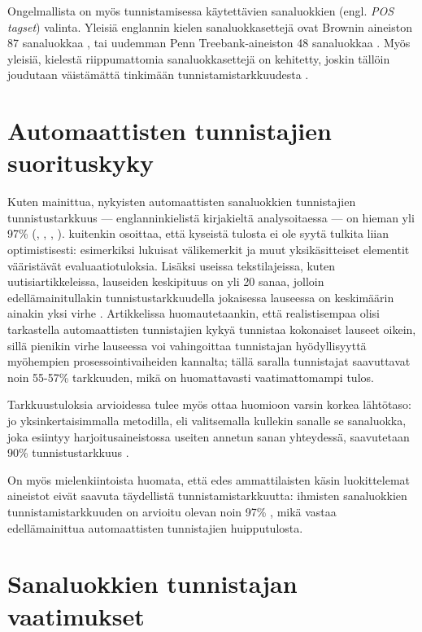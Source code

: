 \documentclass[utf8,bachelor,manualbib]{gradu3}
\begin{document}
Ongelmallista on myös tunnistamisessa käytettävien sanaluokkien (engl. \emph{POS tagset}) valinta. Yleisiä englannin kielen sanaluokkasettejä ovat Brownin aineiston 87 sanaluokkaa \citep{francis1964}, tai uudemman Penn Treebank-aineiston 48 sanaluokkaa \citep{marcus1993}. Myös yleisiä, kielestä riippumattomia sanaluokkasettejä on kehitetty, joskin tällöin joudutaan väistämättä tinkimään tunnistamistarkkuudesta \citep{petrov2011}.


\section{Automaattisten tunnistajien suorituskyky}

Kuten mainittua, nykyisten automaattisten sanaluokkien tunnistajien tunnistustarkkuus --- englanninkielistä kirjakieltä analysoitaessa --- on hieman yli 97\%  (\citealp{toutanova2003}, \citealp{shen2007}, \citealp{spoustova2009}, \citealp{sogaard2010}). \citet{manning2011} kuitenkin osoittaa, että kyseistä tulosta ei ole syytä tulkita liian optimistisesti: esimerkiksi lukuisat välikemerkit ja muut yksikäsitteiset elementit vääristävät evaluaatiotuloksia. Lisäksi useissa tekstilajeissa, kuten uutisiartikkeleissa, lauseiden keskipituus on yli 20 sanaa, jolloin edellämainitullakin tunnistustarkkuudella jokaisessa lauseessa on keskimäärin ainakin yksi virhe \citep{manning1999}. Artikkelissa huomautetaankin, että realistisempaa olisi tarkastella automaattisten tunnistajien kykyä tunnistaa kokonaiset lauseet oikein, sillä pienikin virhe lauseessa voi vahingoittaa tunnistajan hyödyllisyyttä myöhempien prosessointivaiheiden kannalta; tällä saralla tunnistajat saavuttavat noin 55-57\% tarkkuuden, mikä on huomattavasti vaatimattomampi tulos.

Tarkkuustuloksia arvioidessa tulee myös ottaa huomioon varsin korkea lähtötaso: jo yksinkertaisimmalla metodilla, eli valitsemalla kullekin sanalle se sanaluokka, joka esiintyy harjoitusaineistossa useiten annetun sanan yhteydessä, saavutetaan 90\% tunnistustarkkuus \citep{charniak1993}.

 On myös mielenkiintoista huomata, että edes ammattilaisten käsin luokittelemat aineistot eivät saavuta täydellistä tunnistamistarkkuutta: ihmisten sanaluokkien tunnistamistarkkuuden on arvioitu olevan noin 97\% \citep{manning2011}, mikä vastaa edellämainittua automaattisten tunnistajien huipputulosta.


\section{Sanaluokkien tunnistajan vaatimukset}
\end{document}
